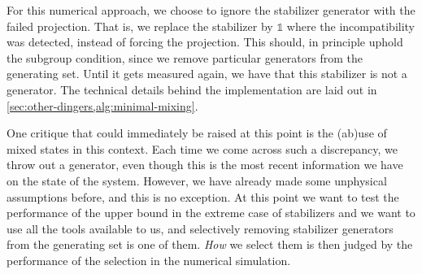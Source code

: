 For this numerical approach, we choose to ignore the stabilizer generator with
the failed projection. That is, we replace the stabilizer by $\mathds{1}$ where
the incompatibility was detected, instead of forcing the projection. This
should, in principle uphold the subgroup condition, since we remove particular
generators from the generating set. Until it gets measured again, we have that
this stabilizer is not a generator. The technical details behind the
implementation are laid out in \cref{sec:other-dingers,alg:minimal-mixing}.

One critique that could immediately be raised at this point is the (ab)use of
mixed states in this context. Each time we come across such a discrepancy, we
throw out a generator, even though this is the most recent information we have
on the state of the system. However, we have already made some unphysical
assumptions before, and this is no exception. At this point we want to test the
performance of the upper bound in the extreme case of stabilizers and we want
to use all the tools available to us, and selectively removing stabilizer
generators from the generating set is one of them. \emph{How} we select them is
then judged by the performance of the selection in the numerical simulation.

